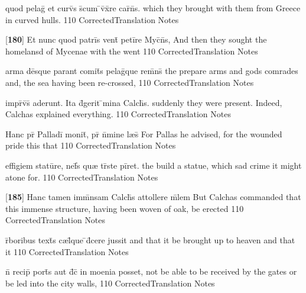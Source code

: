 \latline
  {quod pelag\={} et curv\={\macron {\i}}s s\={}cum \={}v\={}x\={}re car\={\macron {\i}}n\={\macron {\i}}s.}
  { which they brought with them from Greece in curved hulls. }
  {110}
  { CorrectedTranslation }
  { Notes }


\latline
  {[\textbf{180}] Et nunc quod patri\={}s vent\={} peti\={}re Myc\={}n\={}s,}
  { And then they sought the homelansd of Mycenae with the went }
  {110}
  { CorrectedTranslation }
  { Notes }


\latline
  {arma de\={}sque parant comit\={}s pelag\={}que rem\={}ns\={}}
  { the prepare arms and gods comrades and, the sea having been re-crossed,  }
  {110}
  { CorrectedTranslation }
  { Notes }


\latline
  {impr\={}v\={\macron {\i}}s\={\macron {\i}} aderunt.  Ita d\={\macron {\i}}gerit \={}mina Calch\={}s.}
  { suddenly they were present.  Indeed, Calchas explained everything. }
  {110}
  { CorrectedTranslation }
  { Notes }


\latline
  {Hanc pr\={} Palladi\={} monit\={\macron {\i}}, pr\={} n\={}mine l{\ae}s\={}}
  { For Pallas he advised, for the wounded pride this that  }
  {110}
  { CorrectedTranslation }
  { Notes }


\latline
  {effigiem statu\={}re, nef\={}s qu{\ae} tr\={\macron {\i}}ste pi\={}ret.}
  { the build a statue, which sad crime it might atone for. }
  {110}
  { CorrectedTranslation }
  { Notes }


\latline
  {[\textbf{185}] Hanc tamen imm\={}nsam Calch\={}s attollere m\={}lem}
  { But Calchas commanded that this immense structure, having been woven of oak, be erected }
  {110}
  { CorrectedTranslation }
  { Notes }


\latline
  {r\={}boribus text\={\macron {\i}}s c{\ae}l\={}que \={}d\={}cere jussit}
  { and that it be brought up to heaven and that it }
  {110}
  { CorrectedTranslation }
  { Notes }


\latline
  {n\={} recip\={\macron {\i}} port\={\macron {\i}}s aut d\={}c\={\macron {\i}} in moenia posset,}
  { not be able to be received by the gates or be led into the city walls, }
  {110}
  { CorrectedTranslation }
  { Notes }


